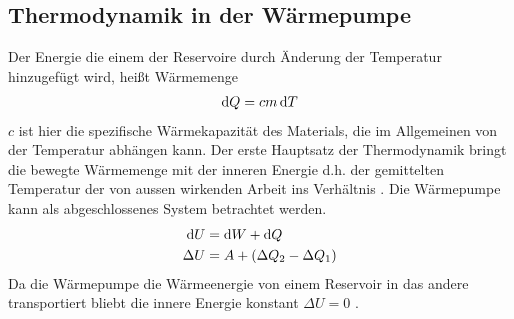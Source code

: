 \subsection{Thermodynamik in der Wärmepumpe}

Der Energie die einem der Reservoire durch Änderung der Temperatur hinzugefügt wird,
heißt Wärmemenge
\begin{align}
    \mathop{}\!\mathrm{d} Q = c m \mathop{}\!\mathrm{d} T 
    \label{eq:dQ}
\end{align} 
$ c $ ist hier die spezifische Wärmekapazität des Materials,
 die im Allgemeinen von der Temperatur abhängen kann.
Der erste Hauptsatz der Thermodynamik bringt die bewegte Wärmemenge
mit der inneren Energie d.h. der gemittelten Temperatur der von aussen wirkenden Arbeit
ins Verhältnis \cite[vgl][318]{demtroeder}. 
Die Wärmepumpe kann als abgeschlossenes System betrachtet werden. 
\begin{align}
                \mathop{}\!\mathrm{d} U &= \mathop{}\!\mathrm{d} W + \mathop{}\!\mathrm{d} Q \\
    \nonumber   \Delta U &= A + (\Delta Q_{2} - \Delta Q_{1})
\end{align}
Da die Wärmepumpe die Wärmeenergie von einem Reservoir in das andere transportiert
    bliebt die innere Energie konstant $ \Delta U = 0 $ .

